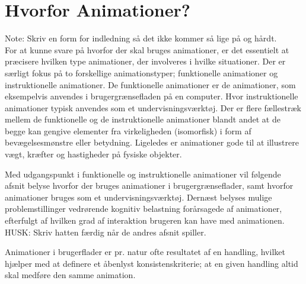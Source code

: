 \chapter{Hvorfor Animationer?}
\label{HvorforAnimationer}
Note: Skriv en form for indledning så det ikke kommer så lige på og hårdt. \\[5mm]
%
For at kunne svare på hvorfor der skal bruges animationer, er det essentielt at præcisere hvilken type animationer, der involveres i hvilke situationer. Der er særligt fokus på to forskellige animationstyper; funktionelle animationer og instruktionelle animationer. De funktionelle animationer er de animationer, som eksempelvis anvendes i brugergrænsefladen på en computer. Hvor instruktionelle animationer typisk anvendes som et undervisningsværktøj. Der er flere fællestræk mellem de funktionelle og de instruktionelle animationer blandt andet at de begge kan gengive elementer fra virkeligheden (isomorfisk) i form af bevægelsesmønstre eller betydning. Ligeledes er animationer gode til at illustrere vægt, kræfter og hastigheder på fysiske objekter. 

Med udgangspunkt i funktionelle og instruktionelle animationer vil følgende afsnit belyse hvorfor der bruges animationer i brugergrænseflader, samt hvorfor animationer bruges som et undervisningsværktøj. Dernæst belyses mulige problemstillinger vedrørende kognitiv belastning forårsagede af animationer, efterfulgt af hvilken grad af interaktion brugeren kan have med animationen. \\[5mm]

HUSK: Skriv hatten færdig når de andres afsnit spiller. 

Animationer i brugerflader er pr. natur ofte resultatet af en handling, hvilket hjælper med at definere et åbenlyst konsistenskriterie; at en given handling altid skal medføre den samme animation. 
%


%


